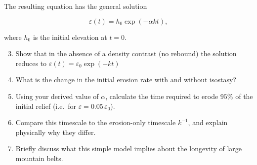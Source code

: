 \documentclass[11pt,a4paper,final]{article}
\begin{document}
The resulting equation has the general solution

\[
\varepsilon(t) = h_0 \exp\!\left(-\alpha k t\right),
\]

where \(h_0\) is the initial elevation at \(t=0\).

\begin{enumerate}
    \setcounter{enumi}{2}
    \item Show that in the absence of a density contrast (no rebound) the solution reduces to \(\varepsilon(t) = \varepsilon_0 \exp(- k t)\)
    \item What is the change in the initial erosion rate with and without isostasy?
    \item Using your derived value of \(\alpha\), calculate the time required to erode
    \(95\%\) of the initial relief (i.e.\ for \(\varepsilon = 0.05\,\varepsilon_0\)).
    \item Compare this timescale to the erosion-only timescale \(k^{-1}\), and explain
    physically why they differ.
    \item Briefly discuss what this simple model implies about the longevity of large
    mountain belts.
\end{enumerate}



\end{document}

